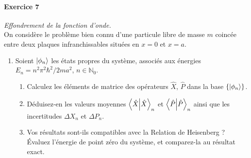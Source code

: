 \paragraph{Exercice 7} \textit{Effondrement de la fonction d'onde.}\\
On considère le problème bien connu d'une particule libre de masse $m$ coincée entre deux plaques infranchissables situées en $x=0$ et $x=a$.
\begin{enumerate}
\item Soient $\ket{\phi_n}$ les états propres du système, associés aux énergies $E_n = n^2\pi^2\hbar^2/2ma^2$, $n\in\mathbb N_0$.
\begin{enumerate}
\item Calculez les éléments de matrice des opérateurs $\hat X$, $\hat P$ dans la base $\lbrace \ket{\phi_n}\rbrace$.
\item Déduisez-en les valeurs moyennes $\braket{\hat X}_n$ et $\braket{\hat P}_n$ ainsi que les incertitudes $\Delta X_n$ et $\Delta P_n$.
\item Vos résultats sont-ils compatibles avec la Relation de Heisenberg ? Évaluez l'énergie de point zéro du système, et comparez-la au résultat exact. 
\end{enumerate}


\end{enumerate}
